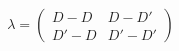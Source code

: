 \begin{equation}
\lambda = \left(
\begin{array}{cc}
D - D  & D - D' \\ D' - D & D' - D'
\end{array}
\right)
\label{cpz2}
\end{equation}

